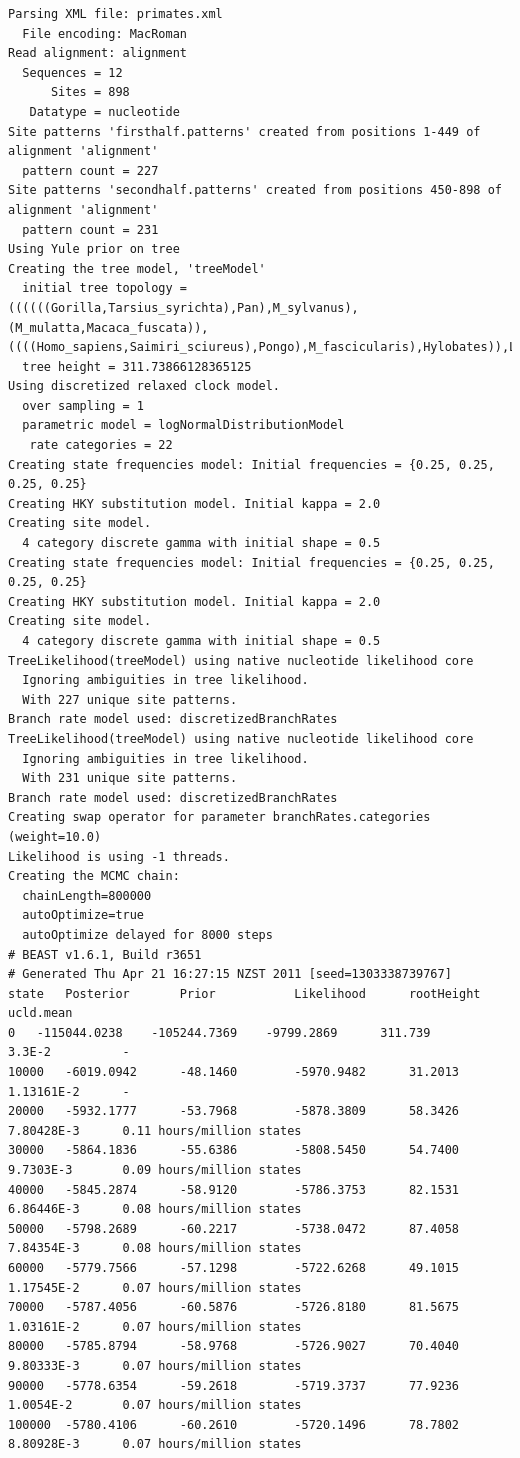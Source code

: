 \documentclass[12pt]{article}
\begin{document}
{\begin{verbatim}
Parsing XML file: primates.xml
  File encoding: MacRoman
Read alignment: alignment
  Sequences = 12
      Sites = 898
   Datatype = nucleotide
Site patterns 'firsthalf.patterns' created from positions 1-449 of alignment 'alignment'
  pattern count = 227
Site patterns 'secondhalf.patterns' created from positions 450-898 of alignment 'alignment'
  pattern count = 231
Using Yule prior on tree
Creating the tree model, 'treeModel'
  initial tree topology = ((((((Gorilla,Tarsius_syrichta),Pan),M_sylvanus),(M_mulatta,Macaca_fuscata)),((((Homo_sapiens,Saimiri_sciureus),Pongo),M_fascicularis),Hylobates)),Lemur_catta)
  tree height = 311.73866128365125
Using discretized relaxed clock model.
  over sampling = 1
  parametric model = logNormalDistributionModel
   rate categories = 22
Creating state frequencies model: Initial frequencies = {0.25, 0.25, 0.25, 0.25}
Creating HKY substitution model. Initial kappa = 2.0
Creating site model.
  4 category discrete gamma with initial shape = 0.5
Creating state frequencies model: Initial frequencies = {0.25, 0.25, 0.25, 0.25}
Creating HKY substitution model. Initial kappa = 2.0
Creating site model.
  4 category discrete gamma with initial shape = 0.5
TreeLikelihood(treeModel) using native nucleotide likelihood core
  Ignoring ambiguities in tree likelihood.
  With 227 unique site patterns.
Branch rate model used: discretizedBranchRates
TreeLikelihood(treeModel) using native nucleotide likelihood core
  Ignoring ambiguities in tree likelihood.
  With 231 unique site patterns.
Branch rate model used: discretizedBranchRates
Creating swap operator for parameter branchRates.categories (weight=10.0)
Likelihood is using -1 threads.
Creating the MCMC chain:
  chainLength=800000
  autoOptimize=true
  autoOptimize delayed for 8000 steps
# BEAST v1.6.1, Build r3651
# Generated Thu Apr 21 16:27:15 NZST 2011 [seed=1303338739767]
state	Posterior   	Prior       	Likelihood  	rootHeight  	ucld.mean   
0	-115044.0238	-105244.7369	-9799.2869  	311.739     	3.3E-2      	-
10000	-6019.0942  	-48.1460    	-5970.9482  	31.2013     	1.13161E-2  	-
20000	-5932.1777  	-53.7968    	-5878.3809  	58.3426     	7.80428E-3  	0.11 hours/million states
30000	-5864.1836  	-55.6386    	-5808.5450  	54.7400     	9.7303E-3   	0.09 hours/million states
40000	-5845.2874  	-58.9120    	-5786.3753  	82.1531     	6.86446E-3  	0.08 hours/million states
50000	-5798.2689  	-60.2217    	-5738.0472  	87.4058     	7.84354E-3  	0.08 hours/million states
60000	-5779.7566  	-57.1298    	-5722.6268  	49.1015     	1.17545E-2  	0.07 hours/million states
70000	-5787.4056  	-60.5876    	-5726.8180  	81.5675     	1.03161E-2  	0.07 hours/million states
80000	-5785.8794  	-58.9768    	-5726.9027  	70.4040     	9.80333E-3  	0.07 hours/million states
90000	-5778.6354  	-59.2618    	-5719.3737  	77.9236     	1.0054E-2   	0.07 hours/million states
100000	-5780.4106  	-60.2610    	-5720.1496  	78.7802     	8.80928E-3  	0.07 hours/million states


\end{verbatim}}
\end{document}
